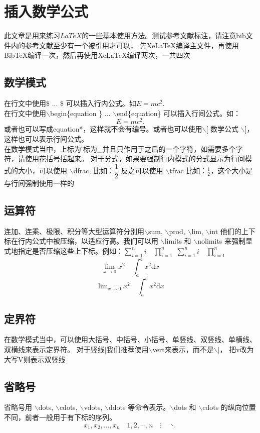 \documentclass[12pt, a4paper, oneside, UTF8]{ctexart}
\begin{document}
\newpage
\tableofcontents
\newpage

\section{插入数学公式}
此文章是用来练习$LaTeX$的一些基本使用方法。测试参考文献标注，请注意bib文件内的参考文献至少有一个被引用才可以，
先XeLaTeX编译主文件，再使用BibTeX编译一次，然后再使用XeLaTeX编译两次，一共四次\citep{munns2002comparative}
\subsection{数学模式}
在行文中使用\$ ... \$ 可以插入行内公式。如$E=mc^2$.\\
在行文中使用$\backslash$begin\{equation \} ... $\backslash$end\{equation\} 可以插入行间公式。如：
\begin{equation}
E=mc^2.
\end{equation}
或者也可以写成equation*，这样就不会有编号。或者也可以使用$\backslash$[ 数学公式 $\backslash$]，
这样也可以表示行间公式。\\在数学模式当中，上标为\^下标为\_并且只作用于之后的一个字符，如需要多个字符，请使用花括号括起来。
对于分式，如果要强制行内模式的分式显示为行间模式的大小，可以使用 $\backslash$dfrac, 
比如：$ \dfrac{1}{2} $
反之可以使用 $\backslash$tfrac
比如：$ \tfrac{1}{2} $，这个大小是与行间强制使用一样的
\subsection{运算符}
连加、连乘、极限、积分等大型运算符分别用$\backslash$sum, $\backslash$prod, $\backslash$lim, $\backslash$int
他们的上下标在行内公式中被压缩，以适应行高。我们可以用 $\backslash$limits 和 $\backslash$nolimits
来强制显式地指定是否压缩这些上下标。例如：$ \sum_{i=1}^n i\quad \prod_{i=1}^n $
$ \sum\limits _{i=1}^n i\quad \prod\limits _{i=1}^n $
\[ \lim_{x\to0}x^2 \quad \int_a^b x^2 \mathrm{d}{x} \]
\[ \lim\nolimits _{x\to0}x^2\quad \int\nolimits_a^b x^2 \mathrm{d}{x} \]
\subsection{定界符}
在数学模式当中，可以使用大括号、中括号、小括号、单竖线、双竖线、单横线、双横线来表示定界符。
对于竖线$\vert$我们推荐使用$\backslash$vert来表示，而不是$\backslash \vert$，
把v改为大写V则表示双竖线
\subsection{省略号}
省略号用 $\backslash$dots, $\backslash$cdots, $\backslash$vdots, $\backslash$ddots 
等命令表示。$\backslash$dots 和 $\backslash$cdots 的纵向位置不同，前者一般用于有下标的序列。
\[ x_1,x_2,\dots ,x_n\quad 1,2,\cdots ,n\quad
\vdots\quad \ddots \]
\end{document}
